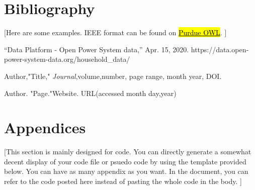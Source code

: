 \documentclass[letterpaper, 11pt]{article}
\begin{document}
\clearpage
\section{Bibliography}

 [Here are some examples. IEEE format can be found on \href{https://owl.purdue.edu/owl/research_and_citation/ieee_style/ieee_overview.html}{\hl{Purdue OWL}}. ]

\begin{thebibliography}{}

    “Data Platform - Open Power System data,” Apr. 15, 2020. https://data.open-power-system-data.org/household\_data/

    Author,"Title," \emph{Journal},volume,number, page range, month year, DOI.

    Author. "Page."Website. URL(accessed month day,year)

\end{thebibliography}

\clearpage
\section{Appendices}
 [This section is mainly designed for code. You can directly generate a somewhat decent display of your code file or psuedo code by using the template provided below. You can have as many appendix as you want. In the document, you can refer to the code posted here instead of pasting the whole code in the body. ]
\end{document}
